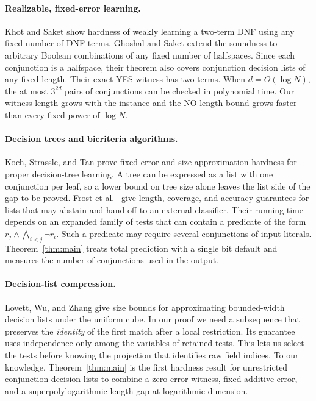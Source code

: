 \documentclass[11pt]{article}
\begin{document}
\paragraph{Realizable, fixed-error learning.}
Khot and Saket \cite{KS} show hardness of weakly learning a two-term DNF
using any fixed number of DNF terms. Ghoshal and Saket \cite[Theorem~1.1]{GS}
extend the soundness to arbitrary Boolean combinations of any fixed number of
halfspaces. Since each conjunction is a halfspace, their theorem also covers
conjunction decision lists of any fixed length. Their exact YES witness has
two terms. When $d=O(\log N)$, the
at most $3^{2d}$ pairs of conjunctions can be checked in polynomial time.
Our witness length grows with the instance and the NO length bound grows
faster than every fixed power of $\log N$.

\paragraph{Decision trees and bicriteria algorithms.}
Koch, Strassle, and Tan \cite{KST23,KST24} prove fixed-error and size-approximation
hardness for proper decision-tree learning. A tree can be expressed as a list
with one conjunction per leaf, so a lower bound on tree size alone leaves the
list side of the gap to be proved. Frost et al.\ \cite[Theorem~3]{FLMM}
give length, coverage, and accuracy guarantees for lists that may abstain
and hand off to an external classifier. Their running time depends on an
expanded family of tests that can contain a
predicate of the form $r_j\wedge\bigwedge_{i<j}\neg r_i$. Such a predicate may
require several conjunctions of input literals. Theorem~\ref{thm:main} treats
total prediction with a single bit default and measures the number of
conjunctions used in the output.

\paragraph{Decision-list compression.}
Lovett, Wu, and Zhang \cite{LWZ} give size bounds for approximating
bounded-width decision lists under the uniform cube. In our proof we need
a subsequence that preserves the \emph{identity} of the first match after
a local restriction. Its guarantee uses independence only among the variables
of retained tests. This lets us select the tests before knowing the
projection that identifies raw field indices. To our knowledge,
Theorem~\ref{thm:main} is the first hardness result for unrestricted
conjunction decision lists to combine a zero-error witness, fixed additive
error, and a superpolylogarithmic length gap at logarithmic dimension.
\end{document}

